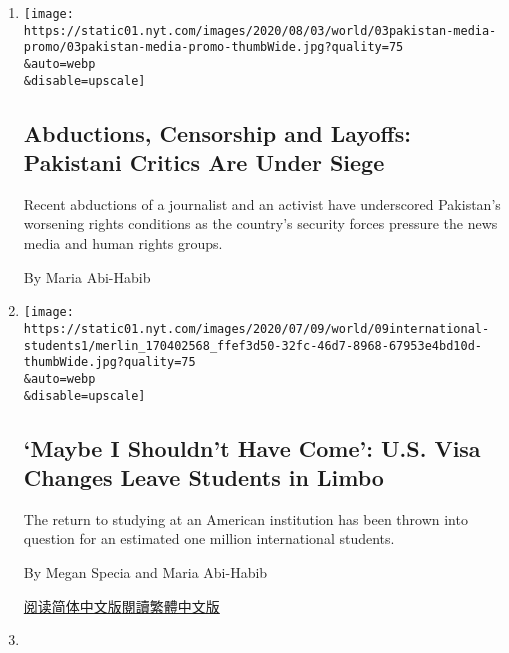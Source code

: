\begin{enumerate}
\def\labelenumi{\arabic{enumi}.}
\item
  \href{/2020/08/03/world/asia/pakistan-media-abductions.html}{}

  \texttt{[image: https://static01.nyt.com/images/2020/08/03/world/03pakistan-media-promo/03pakistan-media-promo-thumbWide.jpg?quality=75\\\&auto=webp\\\&disable=upscale]}

  \hypertarget{abductions-censorship-and-layoffs-pakistani-critics-are-under-siege}{%
  \subsection{Abductions, Censorship and Layoffs: Pakistani Critics Are
  Under
  Siege}\label{abductions-censorship-and-layoffs-pakistani-critics-are-under-siege}}

  Recent abductions of a journalist and an activist have underscored
  Pakistan's worsening rights conditions as the country's security
  forces pressure the news media and human rights groups.

  By Maria Abi-Habib
\item
  \href{/2020/07/09/world/international-students-visa-reaction.html}{}

  \texttt{[image: https://static01.nyt.com/images/2020/07/09/world/09international-students1/merlin\_170402568\_ffef3d50-32fc-46d7-8968-67953e4bd10d-thumbWide.jpg?quality=75\\\&auto=webp\\\&disable=upscale]}

  \hypertarget{maybe-i-shouldnt-have-come-us-visa-changes-leave-students-in-limbo}{%
  \subsection{`Maybe I Shouldn't Have Come': U.S. Visa Changes Leave
  Students in
  Limbo}\label{maybe-i-shouldnt-have-come-us-visa-changes-leave-students-in-limbo}}

  The return to studying at an American institution has been thrown into
  question for an estimated one million international students.

  By Megan Specia and Maria Abi-Habib

  \href{https://cn.nytimes.com/usa/20200710/international-students-visa-reaction/}{阅读简体中文版}\href{https://cn.nytimes.com/usa/20200710/international-students-visa-reaction/zh-hant/}{閱讀繁體中文版}
\item
  \href{/2020/07/08/world/asia/hindu-temple-islamabad-islamists-pakistan.html}{}


\end{enumerate}
